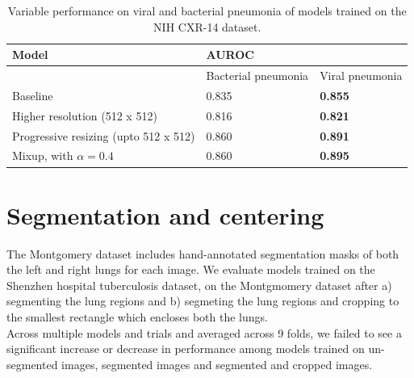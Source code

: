 \documentclass[12pt,oneside,a4paper]{report}
\begin{document}
\begin{table}[]
  \centering
  \begin{tabular}{@{}lll@{}}
    \toprule
    \textbf{Model}                        & \multicolumn{2}{l}{\textbf{AUROC}}  \\ \midrule
    \textbf{}                             & Bacterial pneumonia                             & Viral pneumonia \\ \midrule
    Baseline                              & 0.835                                           & \textbf{0.855}                  \\ \midrule
    Higher resolution (512 x 512)         & 0.816                                           & \textbf{0.821}                  \\ \midrule
    Progressive resizing (upto 512 x 512) & 0.860                                           & \textbf{0.891}                  \\ \midrule
    Mixup, with $\alpha = 0.4$            & 0.860                                           & \textbf{0.895}                  \\ \bottomrule
  \end{tabular}
  \caption{Variable performance on viral and bacterial pneumonia of models trained on the NIH CXR-14 dataset.}
  \label{tab:viral_vs_bacterial}
\end{table}

\section{Segmentation and centering}
The Montgomery dataset includes hand-annotated segmentation masks of both the left and right lungs for each image. We evaluate models trained on the Shenzhen hospital tuberculosis dataset, on the Montgmomery dataset after a) segmenting the lung regions and b) segmeting the lung regions and cropping to the smallest rectangle which encloses both the lungs.\\

Across multiple models and trials and averaged across 9 folds, we failed to see a significant increase or decrease in performance among models trained on un-segmented images, segmented images and segmented and cropped images.
\end{document}
